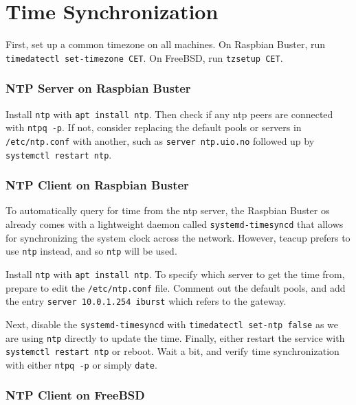\section{Time Synchronization} \label{time_sync}

First, set up a common timezone on all machines. On Raspbian Buster, run \lstinline{timedatectl set-timezone CET}. On FreeBSD, run \lstinline{tzsetup CET}.


\subsubsection{NTP Server on Raspbian Buster}

Install \lstinline{ntp} with \lstinline{apt install ntp}. Then check if any \gls{ntp} peers are connected with \lstinline{ntpq -p}. If not, consider replacing the default pools or servers in \lstinline{/etc/ntp.conf} with another, such as \lstinline{server ntp.uio.no} followed up by \lstinline{systemctl restart ntp}.


\subsubsection{NTP Client on Raspbian Buster}

To automatically query for time from the \gls{ntp} server, the Raspbian Buster \gls{os} already comes with a lightweight daemon called \lstinline{systemd-timesyncd} that allows for synchronizing the system clock across the network. However, \gls{teacup} prefers to use \lstinline{ntp} instead, and so \lstinline{ntp} will be used.

Install \lstinline{ntp} with \lstinline{apt install ntp}. To specify which server to get the time from, prepare to edit the \lstinline{/etc/ntp.conf} file. Comment out the default pools, and add the entry \lstinline{server 10.0.1.254 iburst} which refers to the gateway.

Next, disable the \lstinline{systemd-timesyncd} with \lstinline{timedatectl set-ntp false} as we are using \lstinline{ntp} directly to update the time. Finally, either restart the service with \lstinline{systemctl restart ntp} or reboot. Wait a bit, and verify time synchronization with either \lstinline{ntpq -p} or simply \lstinline{date}.


\subsubsection{NTP Client on FreeBSD}

